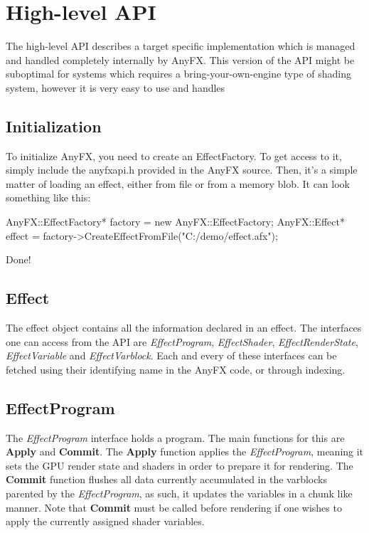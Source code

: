 \documentclass{article}
\begin{document}
\clearpage
\section{High-level API}
The high-level API describes a target specific implementation which is managed and handled completely internally by AnyFX. This version of the API might be suboptimal for systems which requires a bring-your-own-engine type of shading system, however it is very easy to use and handles
\subsection{Initialization}
To initialize AnyFX, you need to create an EffectFactory. To get access to it, simply include the anyfxapi.h provided in the AnyFX source. Then, it's a simple matter of loading an effect, either from file or from a memory blob. It can look something like this:

\begin{CodeBox}
	AnyFX::EffectFactory* factory = new AnyFX::EffectFactory;
	AnyFX::Effect* effect = factory->CreateEffectFromFile("C:/demo/effect.afx");
\end{CodeBox}

Done!

\subsection{Effect}
The effect object contains all the information declared in an effect. The interfaces one can access from the API are \textit{EffectProgram}, \textit{EffectShader}, \textit{EffectRenderState}, \textit{EffectVariable} and \textit{EffectVarblock}. Each and every of these interfaces can be fetched using their identifying name in the AnyFX code, or through indexing.

\subsection{EffectProgram}
The \textit{EffectProgram} interface holds a program. The main functions for this are \textbf{Apply} and \textbf{Commit}. The \textbf{Apply} function applies the \textit{EffectProgram}, meaning it sets the GPU render state and shaders in order to prepare it for rendering. The \textbf{Commit} function flushes all data currently accumulated in the varblocks parented by the \textit{EffectProgram}, as such, it updates the variables in a chunk like manner. Note that \textbf{Commit} must be called before rendering if one wishes to apply the currently assigned shader variables.
\end{document}
